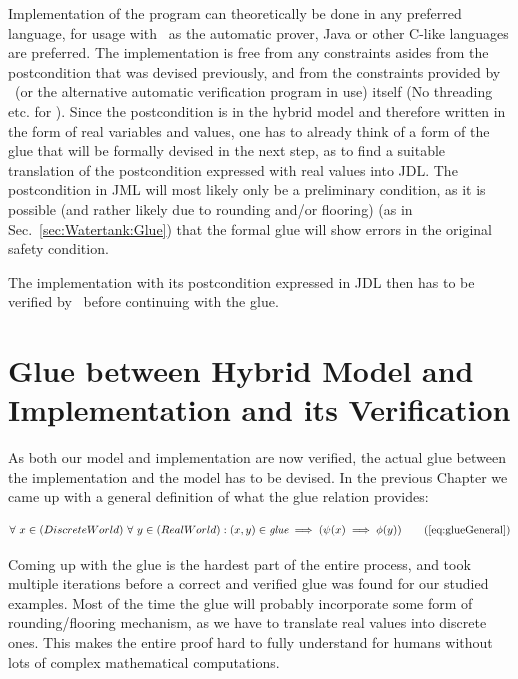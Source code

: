Implementation of the program can theoretically be done in any preferred language, for usage with \key~as the automatic prover, Java or other C-like languages are preferred. The implementation is free from any constraints asides from the postcondition that was devised previously, and from the constraints provided by \key~(or the alternative automatic verification program in use) itself (No threading etc. for \key). Since the postcondition is in the hybrid model and therefore written in the form of real variables and values, one has to already think of a form of the glue that will be formally devised in the next step, as to find a suitable translation of the postcondition expressed with real values into JDL. The postcondition in JML will most likely only be a preliminary condition, as it is possible (and rather likely due to rounding and/or flooring) (as in Sec.~\ref{sec:Watertank:Glue}) that the formal glue will show errors in the original safety condition.

The implementation with its postcondition expressed in JDL then has to be verified by \key~before continuing with the glue. 

\section{Glue between Hybrid Model and Implementation and its Verification}
\label{sec:Process:Glue}

As both our model and implementation are now verified, the actual glue between the implementation and the model has to be devised. In the previous Chapter we came up with a general definition of what the glue relation provides:

\begin{equation}
	\centering
	\begin{split}
		\forall~x \in (Discrete World)~\forall~y \in (Real World):(x,y) \in \textit{glue} \implies (\psi(x) \implies \phi(y))
	\end{split}
	\tag{\ref{eq:glueGeneral}}
\end{equation}

Coming up with the glue is the hardest part of the entire process, and took multiple iterations before a correct and verified glue was found for our studied examples. Most of the time the glue will probably incorporate some form of rounding/flooring mechanism, as we have to translate real values into discrete ones. This makes the entire proof hard to fully understand for humans without lots of complex mathematical computations.

